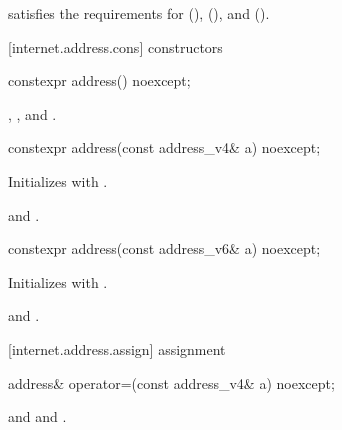 %
\pnum
{} satisfies the requirements for  (),  (), and  ().


%
[internet.address.cons]{ constructors}

\begin{itemdecl}
constexpr address() noexcept;
\end{itemdecl}

\begin{itemdescr}
\pnum
\postconditions {}, , and .
\end{itemdescr}

\begin{itemdecl}
constexpr address(const address_v4& a) noexcept;
\end{itemdecl}

\begin{itemdescr}
\pnum
\effects Initializes  with .

\pnum
\postconditions {} and .
\end{itemdescr}

\begin{itemdecl}
constexpr address(const address_v6& a) noexcept;
\end{itemdecl}

\begin{itemdescr}
\pnum
\effects Initializes  with .

\pnum
\postconditions {} and .
\end{itemdescr}



%
[internet.address.assign]{ assignment}

\begin{itemdecl}
address& operator=(const address_v4& a) noexcept;
\end{itemdecl}

\begin{itemdescr}
\pnum
\postconditions {} and  and .

\pnum
\returns {}
\end{itemdescr}

